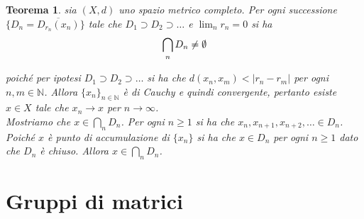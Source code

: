 \documentclass[oneside, 11pt]{amsbook}
\makeatletter
\newcommand{\0}{{(0)}}
\newcommand{\3}{{(3)}}
\theoremstyle{colonplain}
\newtheorem{thm}{Teorema}[chapter]
\theoremstyle{colondefinition}
\theoremstyle{colonremark}
\numberwithin{equation}{chapter}
\renewcommand{\proofname}{Dimostrazione}
\renewenvironment{proof}[1][\proofname]{\par
  \pushQED{\qed}%
  \normalfont \topsep6\p@\@plus6\p@\relax
  \trivlist
  \item[\hskip\labelsep\bfseries #1:]\ignorespaces
}{%
  \popQED\endtrivlist\@endpefalse
}
\makeatother
\begin{document}
\begin{thm}
sia $(X, d)$ uno spazio metrico completo. Per ogni successione $\{D_n = \overline{{D}_{r_n}(x_n)}\}$ tale che $D_1 \supset D_2 \supset \dots$ e $\lim_n r_n = 0$ si ha 
\begin{align}
    \bigcap_{n}D_n \neq \emptyset \notag
\end{align}
\begin{proof}
poiché per ipotesi $D_1 \supset D_2 \supset \dots$ si ha che $d(x_n, x_m) < |r_n - r_m|$ per ogni $n, m \in \mathbb{N}$. Allora $\{x_n\}_{n \in \mathbb{N}}$ è di Cauchy e quindi convergente, pertanto esiste $x \in X$ tale che $x_n \rightarrow x$ per $n \rightarrow \infty$. \\
Mostriamo che $x \in \bigcap_n D_n$. Per ogni $n \geq 1$ si ha che $x_n, x_{n + 1}, x_{n + 2}, \dots \in D_n$. Poiché $x$ è punto di accumulazione di $\{x_n\}$ si ha che $x \in D_n$ per ogni $n \geq 1$ dato che $D_n$ è chiuso. Allora $x \in \bigcap_n D_n$. 
\end{proof}
\end{thm}

\chapter{Gruppi di matrici}
\end{document}

